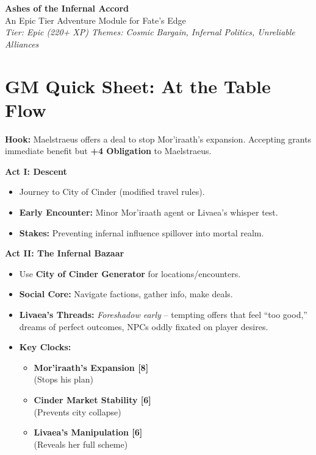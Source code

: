 \documentclass[11pt,letterpaper]{article}
\newcommand{\clockbox}[2]{\noindent\textbf{#1 [#2]}\\}
\begin{document}
\begin{center}
    {\LARGE \textbf{Ashes of the Infernal Accord}}\\[0.5em]
    {\large An Epic Tier Adventure Module for Fate's Edge}\\[1em]
    {\itshape Tier: Epic (220+ XP) \quad Themes: Cosmic Bargain, Infernal Politics, Unreliable Alliances}
\end{center}

\section*{GM Quick Sheet: At the Table Flow}

\textbf{Hook:} Maelstraeus offers a deal to stop Mor'iraath's expansion. Accepting grants immediate benefit but \textbf{+4 Obligation} to Maelstraeus.

\textbf{Act I: Descent}
\begin{itemize}[leftmargin=*]
    \item Journey to City of Cinder (modified travel rules).
    \item \textbf{Early Encounter:} Minor Mor'iraath agent or Livaea's whisper test.
    \item \textbf{Stakes:} Preventing infernal influence spillover into mortal realm.
\end{itemize}

\textbf{Act II: The Infernal Bazaar}
\begin{itemize}[leftmargin=*]
    \item Use \textbf{City of Cinder Generator} for locations/encounters.
    \item \textbf{Social Core:} Navigate factions, gather info, make deals.
    \item \textbf{Livaea's Threads:} \textit{Foreshadow early} -- tempting offers that feel ``too good,'' dreams of perfect outcomes, NPCs oddly fixated on player desires.
    \item \textbf{Key Clocks:}
    \begin{itemize}
        \item \clockbox{Mor'iraath's Expansion}{8} (Stops his plan)
        \item \clockbox{Cinder Market Stability}{6} (Prevents city collapse)
        \item \clockbox{Livaea's Manipulation}{6} (Reveals her full scheme)
    \end{itemize}
\end{itemize}
\end{document}
